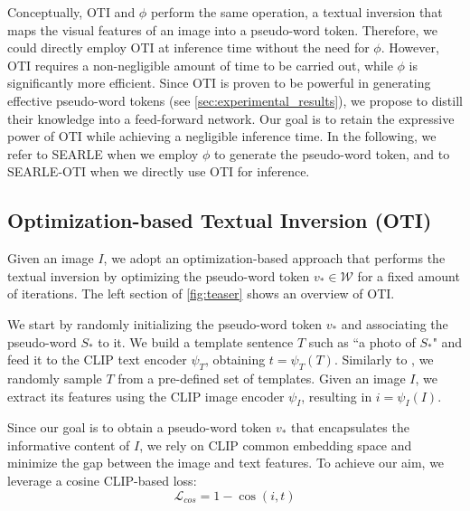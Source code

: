 \documentclass[10pt,twocolumn,letterpaper]{article}
\newcommand{\method}{SEARLE\xspace}
\begin{document}
Conceptually, OTI and $\phi$ perform the same operation, \ie a textual inversion that maps the visual features of an image into a pseudo-word token. Therefore, we could directly employ OTI at inference time without the need for $\phi$. However, OTI requires a non-negligible amount of time to be carried out, while $\phi$ is significantly more efficient. Since OTI is proven to be powerful in generating effective pseudo-word tokens (see \cref{sec:experimental_results}), we propose to distill their knowledge into a feed-forward network. Our goal is to retain the expressive power of OTI while achieving a negligible inference time. In the following, we refer to \method when we employ $\phi$ to generate the pseudo-word token, and to \method-OTI when we directly use OTI for inference.  

\subsection{Optimization-based Textual Inversion (OTI)}\label{sec:optimization}
Given an image $I$, we adopt an optimization-based approach that performs the textual inversion by optimizing the pseudo-word token $v_* \in \mathcal{W}$ for a fixed amount of iterations. The left section of \cref{fig:teaser} shows an overview of OTI.

We start by randomly initializing the pseudo-word token $v_*$ and associating the pseudo-word $S_*$ to it. We build a template sentence $T$  such as ``a photo of $S_*$" and feed it to the CLIP text encoder $\psi_T$, obtaining $t = \psi_{T}(T)$. Similarly to \cite{cohen2022this}, we randomly sample $T$ from a pre-defined set of templates. Given an image $I$, we extract its features using the CLIP image encoder $\psi_{I}$, resulting in $i = \psi_{I}(I)$.

Since our goal is to obtain a pseudo-word token $v_*$ that encapsulates the informative content of $I$, we rely on CLIP common embedding space and minimize the gap between the image and text features. To achieve our aim, we leverage a cosine CLIP-based loss:
\begin{equation}
    \mathcal{L}_{cos} = 1 - \cos{(i, t)}
\end{equation}
 
\end{document}
